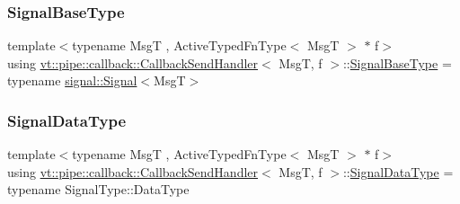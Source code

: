 \subsubsection{\texorpdfstring{Signal\+Base\+Type}{SignalBaseType}}
{\footnotesize\ttfamily template$<$typename MsgT , Active\+Typed\+Fn\+Type$<$ Msg\+T $>$ $\ast$ f$>$ \\
using \hyperlink{structvt_1_1pipe_1_1callback_1_1_callback_send_handler}{vt\+::pipe\+::callback\+::\+Callback\+Send\+Handler}$<$ MsgT, f $>$\+::\hyperlink{structvt_1_1pipe_1_1callback_1_1_callback_send_handler_af46916844a27c29e7c6134f962d0964f}{Signal\+Base\+Type} =  typename \hyperlink{structvt_1_1pipe_1_1signal_1_1_signal}{signal\+::\+Signal}$<$MsgT$>$}

\mbox{\label{structvt_1_1pipe_1_1callback_1_1_callback_send_handler_abe4218870eea9f91ac7bbffbc58b92fd}} 
\subsubsection{\texorpdfstring{Signal\+Data\+Type}{SignalDataType}}
{\footnotesize\ttfamily template$<$typename MsgT , Active\+Typed\+Fn\+Type$<$ Msg\+T $>$ $\ast$ f$>$ \\
using \hyperlink{structvt_1_1pipe_1_1callback_1_1_callback_send_handler}{vt\+::pipe\+::callback\+::\+Callback\+Send\+Handler}$<$ MsgT, f $>$\+::\hyperlink{structvt_1_1pipe_1_1callback_1_1_callback_send_handler_abe4218870eea9f91ac7bbffbc58b92fd}{Signal\+Data\+Type} =  typename Signal\+Type\+::\+Data\+Type}

\mbox{\label{structvt_1_1pipe_1_1callback_1_1_callback_send_handler_a1d3583e27e8cb606b31de9c3a9daa25b}} 
